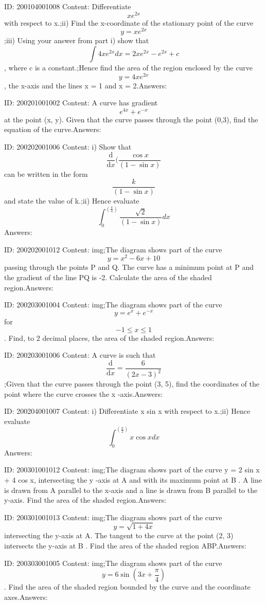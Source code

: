 \documentclass{article}
\begin{document}
ID: 200104001008
Content:
Differentiate $$xe^{2x}$$ with respect to x.;ii) Find the x-coordinate of the stationary point of the curve $$y=xe^{2x}$$;iii) Using your answer from part i) show that $$\int4xe^{2x}dx=2xe^{2x}-e^{2x}+c$$, where c is a constant.;Hence find the area of the region enclosed by the curve $$y=4xe^{2x}$$, the x-axis and the lines x = 1 and x = 2.Answers:

ID: 200201001002
Content:
A curve has gradient $$e^{4x}+e^{-x}$$ at the point (x, y). Given that the curve passes through the point (0,3), find the equation of the curve.Answers:

ID: 200202001006
Content:
i) Show that \[\frac{\mathrm{d} }{\mathrm{d} x}(\frac{\cos x}{(1-\sin x)} \]can be written in the form $$ \frac{k}{(1-\sin x)}$$ and state the value of k.;ii) Hence evaluate $$\int_0^{(\frac{\pi}{4})}\frac{\sqrt2}{(1-\sin x)}dx$$Answers:

ID: 200202001012
Content:
img;The diagram shows part of the curve $$y=x^2-6x+10$$ passing through the points P and Q. The curve has a minimum point at P and the gradient of the line PQ is -2. Calculate the area of the shaded region.Answers:

ID: 200203001004
Content:
img;The diagram shows part of the curve $$y=e^x+e^{-x}$$ for $$-1\leq x\leq1$$. Find, to 2 decimal places, the area of the shaded region.Answers:

ID: 200203001006
Content:
A curve is such that $$\frac{\mathrm{d} }{\mathrm{d} x}=\frac{6}{(2x-3)^2}$$;Given that the curve passes through the point (3, 5), find the coordinates of the point where the curve crosses the x -axis.Answers:

ID: 200204001007
Content:
i) Differentiate x sin x with respect to x.;ii) Hence evaluate $$\int_0^{( \frac{\pi }{2})}x\cos x dx$$Answers:

ID: 200301001012
Content:
img;The diagram shows part of the curve y = 2 sin  x + 4 cos  x, intersecting the y -axis at A and with its maximum point at B . A line is drawn from A parallel to the x-axis and a line is drawn from B parallel to the y-axis. Find the area of the shaded region.Answers:

ID: 200301001013
Content:
img;The diagram shows part of the curve $$y=\sqrt{1+4x}$$ intersecting the y-axis at A. The tangent to the curve at the point (2, 3) intersects the y-axis at B . Find the area of the shaded region ABP.Answers:

ID: 200303001005
Content:
img;The diagram shows part of the curve $$y=6\sin (3x+\frac{\pi }{4})$$. Find the area of the shaded region bounded by the curve and the coordinate axes.Answers:
\end{document}
